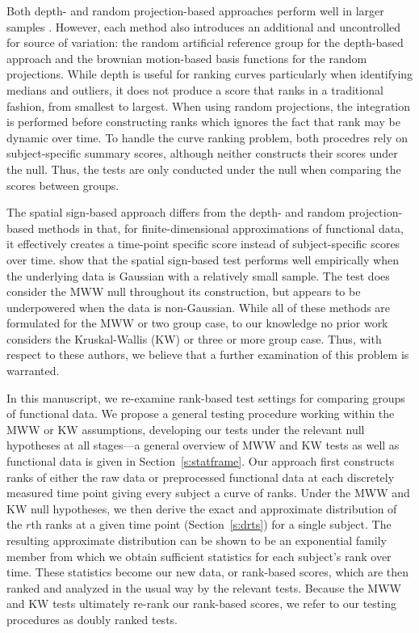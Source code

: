 \documentclass[12pt]{article}
\theoremstyle{plain}
\begin{document}
	Both depth- and random projection-based approaches perform well in larger samples \citep{Lopez2009,Lopez2010,Melendez2021}. However, each method also introduces an additional and uncontrolled for source of variation: the random artificial reference group for the depth-based approach and the brownian motion-based basis functions for the random projections. While depth is useful for ranking curves particularly when identifying medians and outliers, it does not produce a score that ranks in a traditional fashion, from smallest to largest. When using random projections, the integration is performed before constructing ranks which ignores the fact that rank may be dynamic over time. To handle the curve ranking problem, both procedres rely on subject-specific summary scores, although neither constructs their scores under the null. Thus, the tests are only conducted under the null when comparing the scores between groups. 
	
	The spatial sign-based approach differs from the depth- and random projection-based methods in that, for finite-dimensional approximations of functional data, it effectively creates a time-point specific score instead of subject-specific scores over time.
	\cite{Chak2015} show that the spatial sign-based test performs well empirically when the underlying data is Gaussian with a relatively small sample. The test does consider the MWW null throughout its construction, but appears to be underpowered when the data is non-Gaussian. While all of these methods are formulated for the MWW or two group case, to our knowledge no prior work considers the Kruskal-Wallis (KW) or three or more group case. Thus, with respect to these authors, we believe that a further examination of this problem is warranted. 
	
	In this manuscript, we re-examine rank-based test settings for comparing groups of functional data. We propose a general testing procedure working within the MWW or KW assumptions, developing our tests under the relevant null hypotheses at all stages---a general overview of MWW and KW tests as well as functional data is given in Section~\ref{s:statframe}. Our approach first constructs ranks of either the raw data or preprocessed functional data at each discretely measured time point giving every subject a curve of ranks. Under the MWW and KW null hypotheses, we then derive the exact and approximate distribution of the $r$th ranks at a given time point (Section~\ref{s:drts}) for a single subject. The resulting approximate distribution can be shown to be an exponential family member from which we obtain sufficient statistics for each subject's rank over time. These statistics become our new data, or rank-based scores, which are then ranked and analyzed in the usual way by the relevant tests. Because the MWW and KW tests ultimately re-rank our rank-based scores, we refer to our testing procedures as doubly ranked tests.
	
\end{document}
